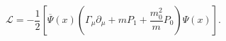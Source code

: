 \begin{equation}
\mathcal{L}=-\frac 12\left[ \overline{\Psi }(x)\left( \Gamma _\mu
\partial_\mu +mP_1 +\frac{m_0^2}{m}P_0\right) \Psi (x)\right] . \label{54}
\end{equation}

